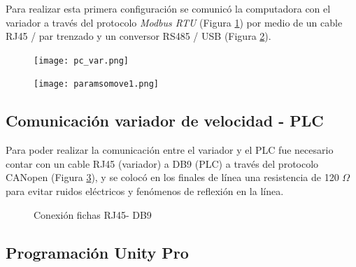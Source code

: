 Para realizar esta primera configuración se comunicó la computadora con el variador a través del protocolo \textit{Modbus RTU} (Figura \ref{fig:pcvar}) por medio de un cable RJ45 / par trenzado y un conversor RS485 / USB (Figura \ref{fig:paramsomove1}). 
\begin{figure}[H]
	\centering
	\texttt{[image: pc\_var.png]}
	\label{fig:pcvar}
\end{figure}

\begin{figure}[h!]
	\centering
	\texttt{[image: paramsomove1.png]}
	\label{fig:paramsomove1}
\end{figure}


\subsection{Comunicación variador de velocidad - PLC}
Para poder realizar la comunicación entre el variador y el PLC fue necesario contar con un cable RJ45 (variador) a DB9 (PLC) a través del protocolo CANopen (Figura \ref{fig:cable}), y se colocó en los finales de línea una resistencia de 120 $\Omega$ para evitar ruidos eléctricos y fenómenos de reflexión en la línea.


\begin{figure}[h!]
    \centering
    \caption{Conexión fichas RJ45- DB9} \label{fig:cable}
    \end{figure}



\subsection{Programación Unity Pro}


